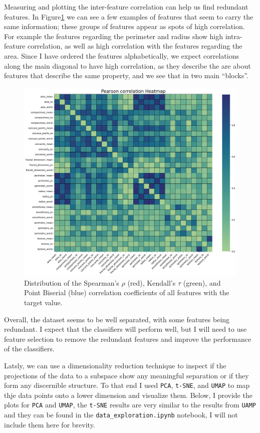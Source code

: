 \documentclass[12pt]{article}
\begin{document}
Measuring and plotting the inter-feature correlation can help us find redundant
features. In Figure\ref{fig:corr_coeffs_heatmap} we can see a few examples of
features that seem to carry the same information; these groups of features
appear as spots of high correlation. For example the features regarding the
perimeter and radius show high intra-feature correlation, as well as high
correlation with the features regarding the area. Since I have ordered the
features alphabetically, we expect correlations along the main diagonal to
have high correlation, as they describe the are about features that describe the
same property, and we see that in two main ``blocks''.

\begin{figure}[H]
    \centering
    \includegraphics[width=\textwidth]{ims/corr_coeffs_heatmap.png}
    \caption{Distribution of the Spearman's $\rho$ (red), Kendall's $\tau$
    (green), and Point Biserial (blue) correlation coefficients of all features
    with the target value.}
    \label{fig:corr_coeffs_heatmap}
\end{figure}

Overall, the dataset seems to be well separated, with some features being
redundant. I expect that the classifiers will perform well, but I will need to
use feature selection to remove the redundant features and improve the
performance of the classifiers.

Latsly, we can use a dimensionality reduction technique to inspect if the
projections of the data to a subspace show any meaningful separation or if they
form any discernible structure. To that end I used \texttt{PCA}, \texttt{t-SNE},
and \texttt{UMAP} to map thje data points onto a lower dimension and visualize
them. Below, I provide the plots for \texttt{PCA} and \texttt{UMAP}, the
\texttt{t-SNE} results are very similar to the results from \texttt{UAMP} and
they can be found in the \texttt{data\_exploration.ipynb} notebook, I will not
include them here for brevity.
\end{document}

